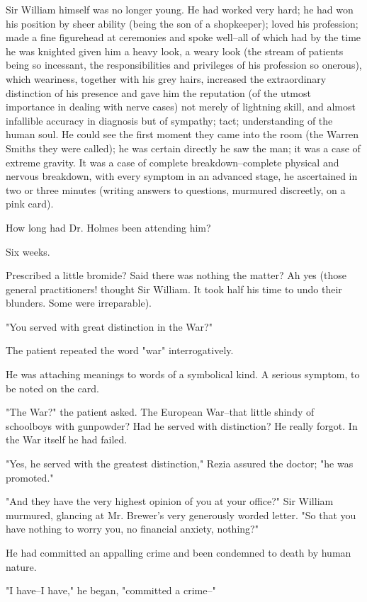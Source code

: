 \documentclass[lang=cn,10pt]{elegantbook}
\begin{document}
Sir William himself was no longer young.  He had worked very hard;
he had won his position by sheer ability (being the son of a
shopkeeper); loved his profession; made a fine figurehead at
ceremonies and spoke well--all of which had by the time he was
knighted given him a heavy look, a weary look (the stream of
patients being so incessant, the responsibilities and privileges of
his profession so onerous), which weariness, together with his grey
hairs, increased the extraordinary distinction of his presence and
gave him the reputation (of the utmost importance in dealing with
nerve cases) not merely of lightning skill, and almost infallible
accuracy in diagnosis but of sympathy; tact; understanding of the
human soul.  He could see the first moment they came into the room
(the Warren Smiths they were called); he was certain directly he
saw the man; it was a case of extreme gravity.  It was a case of
complete breakdown--complete physical and nervous breakdown, with
every symptom in an advanced stage, he ascertained in two or three
minutes (writing answers to questions, murmured discreetly, on a
pink card).

How long had Dr. Holmes been attending him?

Six weeks.

Prescribed a little bromide?  Said there was nothing the matter?
Ah yes (those general practitioners! thought Sir William.  It took
half his time to undo their blunders.  Some were irreparable).

"You served with great distinction in the War?"

The patient repeated the word "war" interrogatively.

He was attaching meanings to words of a symbolical kind.  A serious
symptom, to be noted on the card.

"The War?" the patient asked.  The European War--that little shindy
of schoolboys with gunpowder?  Had he served with distinction?  He
really forgot.  In the War itself he had failed.

"Yes, he served with the greatest distinction," Rezia assured the
doctor; "he was promoted."

"And they have the very highest opinion of you at your office?" Sir
William murmured, glancing at Mr. Brewer's very generously worded
letter.  "So that you have nothing to worry you, no financial
anxiety, nothing?"

He had committed an appalling crime and been condemned to death by
human nature.

"I have--I have," he began, "committed a crime--"
\end{document}

